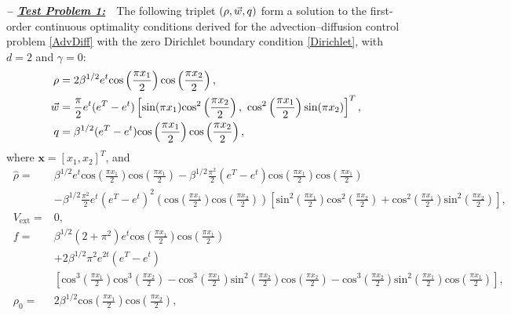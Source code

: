 \textbf{\emph{-- \underline{Test Problem 1:}}}~~The following triplet $(\rho,\vec{w},q)$ form a solution to the first-order continuous optimality conditions derived for the advection--diffusion control problem \eqref{AdvDiff} with the zero Dirichlet boundary condition \eqref{Dirichlet}, with $d=2$ and $\gamma =0$:
\begin{align*}
\ \rho={}&2 \beta^{1/2}e^{t}\text{cos}\left(\frac{\pi{}x_1}{2}\right)\text{cos}\left(\frac{\pi{}x_2}{2}\right), \\
\ \vec{w}={}&\frac{\pi}{2} e^{t}(e^{T}-e^{t})\left[\text{sin}(\pi{}x_1)\text{cos}^2\left(\frac{\pi{}x_2}{2}\right),~\text{cos}^2\left(\frac{\pi{}x_1}{2}\right)\text{sin}(\pi{}x_2)\right]^T, \\
\ \adj={}&\beta^{1/2}(e^{T}-e^{t})\text{cos}\left(\frac{\pi{}x_1}{2}\right)\text{cos}\left(\frac{\pi{}x_2}{2}\right),
\end{align*}
where $\boldsymbol{x}=[x_1,x_2]^T$, and
\begin{align*}
\ \widehat{\rho}={}&\beta^{1/2} e^{t}\text{cos}\left(\frac{\pi{}x_1}{2}\right)\text{cos}\left(\frac{\pi{}x_1}{2}\right) -\beta^{1/2}\frac{\pi^2}{2}(e^{T}-e^{t})\text{cos}\left(\frac{\pi{}x_1}{2}\right)\text{cos}\left(\frac{\pi{}x_1}{2}\right) \\
\ &-\beta^{1/2}\frac{\pi^2}{2}e^{t}(e^{T}-e^{t})^2\left(\text{cos}\left(\frac{\pi{}x_1}{2}\right)\text{cos}\left(\frac{\pi{}x_2}{2}\right)\right)\left[\text{sin}^2\left(\frac{\pi{}x_1}{2}\right)\text{cos}^2\left(\frac{\pi{}x_2}{2}\right)+\text{cos}^2\left(\frac{\pi{}x_1}{2}\right)\text{sin}^2\left(\frac{\pi{}x_2}{2}\right)\right], \\
\ V_{\text{ext}}={}&0, \\
\ f={}&\beta^{1/2}\left(2+\pi^2\right)e^{t}\text{cos}\left(\frac{\pi{}x_1}{2}\right)\text{cos}\left(\frac{\pi{}x_1}{2}\right) \\
\ &+ 2\beta^{1/2}\pi^2 e^{2t}(e^{T}-e^{t})\\
&\left[\text{cos}^3\left(\frac{\pi{}x_1}{2}\right)\text{cos}^3\left(\frac{\pi{}x_2}{2}\right)
-\text{cos}^3\left(\frac{\pi{}x_1}{2}\right)\text{sin}^2\left(\frac{\pi{}x_2}{2}\right)\text{cos}\left(\frac{\pi{}x_2}{2}\right)-\text{cos}^3\left(\frac{\pi{}x_2}{2}\right)\text{sin}^2\left(\frac{\pi{}x_1}{2}\right)\text{cos}\left(\frac{\pi{}x_1}{2}\right)\right], \\
\ \rho_{0}={}&2 \beta^{1/2}\text{cos}\left(\frac{\pi{}x_1}{2}\right)\text{cos}\left(\frac{\pi{}x_2}{2}\right),
\end{align*}

